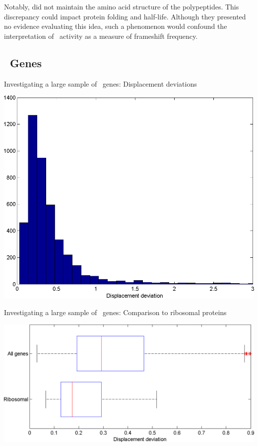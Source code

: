 \documentclass[twocolumn, article, oneside]{memoir}
\begin{document}
Notably, \citeauthor{weiss87} did not maintain the amino acid structure of the polypeptides.  
This discrepancy could impact protein folding and half-life.  Although they
presented no evidence evaluating this idea, such a phenomenon would confound the interpretation 
of \bgals\ activity as a measure of frameshift frequency.

\subsection{\ecoli\ Genes}
\begin{cfigure}
  \caption{Investigating a large sample of \ecoli\ genes: Displacement deviations}
  \label{ecoli:hist}
  \includegraphics[width=\linewidth]{histograms/everything}
\end{cfigure}

\begin{cfigure}
  \caption{Investigating a large sample of \ecoli\ genes: Comparison
    to ribosomal proteins}
  \label{ribosomal:comp}
  \includegraphics[width=\linewidth]{histograms/ribosomal}
\end{cfigure}
\end{document}
